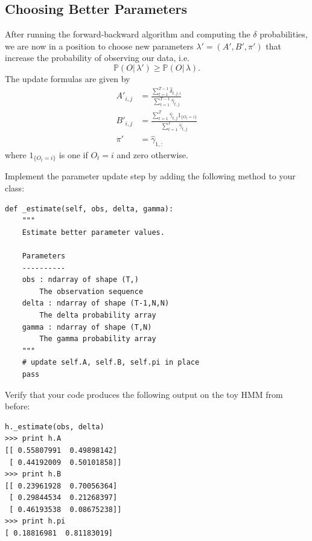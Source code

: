 \subsection*{Choosing Better Parameters}
After running the forward-backward algorithm and computing the $\delta$ probabilities, we are now in a position to choose new parameters $\lambda' = (A', B', \pi')$
that increase the probability of observing our data, i.e.
\[
\mathbb{P}(O|\,\lambda') \geq \mathbb{P}(O|\,\lambda).
\]
The update formulas are given by
\begin{align*}
A'_{i,j} &= \frac{\sum_{t=1}^{T-1}\widehat{\delta}_{t,j,i}}{\sum_{t=1}^{T-1}\widehat{\gamma}_{t,j}}\\
B'_{i,j} &= \frac{\sum_{t=1}^{T}\widehat{\gamma}_{t,j}1_{\{O_t=i\}}}{\sum_{t=1}^{T}\widehat{\gamma}_{t,j}}\\
\pi' &= \widehat{\gamma}_{1,:}
\end{align*}
where $1_{\{O_t=i\}}$ is one if $O_t=i$ and zero otherwise.
\begin{problem}
Implement the parameter update step by adding the following method to your class:
\begin{lstlisting}
def _estimate(self, obs, delta, gamma):
    """
    Estimate better parameter values.

    Parameters
    ----------
    obs : ndarray of shape (T,)
        The observation sequence
    delta : ndarray of shape (T-1,N,N)
        The delta probability array
    gamma : ndarray of shape (T,N)
        The gamma probability array
    """
    # update self.A, self.B, self.pi in place
    pass
\end{lstlisting}
Verify that your code produces the following output on the toy HMM from before:
\begin{lstlisting}
h._estimate(obs, delta)
>>> print h.A
[[ 0.55807991  0.49898142]
 [ 0.44192009  0.50101858]]
>>> print h.B
[[ 0.23961928  0.70056364]
 [ 0.29844534  0.21268397]
 [ 0.46193538  0.08675238]]
>>> print h.pi
[ 0.18816981  0.81183019]
\end{lstlisting}
\end{problem}

